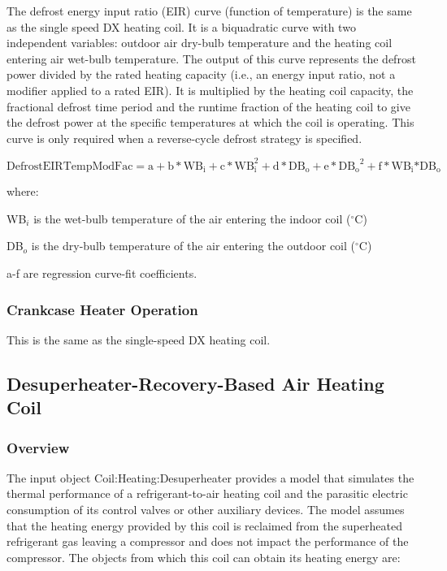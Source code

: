 The defrost energy input ratio (EIR) curve (function of temperature) is the same as the single speed DX heating coil. It is a biquadratic curve with two independent variables: outdoor air dry-bulb temperature and the heating coil entering air wet-bulb temperature. The output of this curve represents the defrost power divided by the rated heating capacity (i.e., an energy input ratio, not a modifier applied to a rated EIR). It is multiplied by the heating coil capacity, the fractional defrost time period and the runtime fraction of the heating coil to give the defrost power at the specific temperatures at which the coil is operating. This curve is only required when a reverse-cycle defrost strategy is specified.

\begin{equation}
{\mathrm{DefrostEIRTempModFac}} = {\mathrm{a}} + {\mathrm{b*W}}{{\mathrm{B}}_{\mathrm{i}}} + {\mathrm{c*WB}}_{\mathrm{i}}^2 + {\mathrm{d*D}}{{\mathrm{B}}_{\mathrm{o}}} + {\mathrm{e*D}}{{\mathrm{B}}_{\mathrm{o}}}^2 + {\mathrm{f*W}}{{\mathrm{B}}_{\mathrm{i}}}{\mathrm{*D}}{{\mathrm{B}}_{\mathrm{o}}}
\end{equation}

where:

WB\(_{i}\) is the wet-bulb temperature of the air entering the indoor coil (\(^{\circ}\)C)

DB\(_{o}\) is the dry-bulb temperature of the air entering the outdoor coil (\(^{\circ}\)C)

a-f are regression curve-fit coefficients.

\subsubsection{Crankcase Heater Operation}\label{crankcase-heater-operation}

This is the same as the single-speed DX heating coil.

\subsection{Desuperheater-Recovery-Based Air Heating Coil}\label{desuperheater-recovery-based-air-heating-coil}

\subsubsection{Overview}\label{overview-9}

The input object Coil:Heating:Desuperheater provides a model that simulates the thermal performance of a refrigerant-to-air heating coil and the parasitic electric consumption of its control valves or other auxiliary devices. The model assumes that the heating energy provided by this coil is reclaimed from the superheated refrigerant gas leaving a compressor and does not impact the performance of the compressor. The objects from which this coil can obtain its heating energy are:


